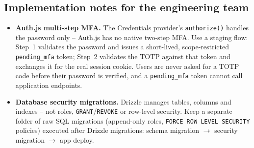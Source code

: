 \subsection*{Implementation notes for the engineering team}

\begin{itemize}
  \item \textbf{Auth.js multi-step MFA.} The Credentials provider's \texttt{authorize()}
        handles the password only -- Auth.js has no native two-step MFA. Use a staging
        flow: Step~1 validates the password and issues a short-lived,
        scope-restricted \texttt{pending\_mfa} token; Step~2 validates the TOTP against
        that token and exchanges it for the real session cookie. Users are never asked
        for a TOTP code before their password is verified, and a
        \texttt{pending\_mfa} token cannot call application endpoints.
  \item \textbf{Database security migrations.} Drizzle manages tables, columns and
        indexes -- not roles, \texttt{GRANT}/\texttt{REVOKE} or row-level security.
        Keep a separate folder of raw SQL migrations (append-only roles,
        \texttt{FORCE ROW LEVEL SECURITY} policies) executed after Drizzle migrations:
        schema migration $\rightarrow$ security migration $\rightarrow$ app deploy.
\end{itemize}